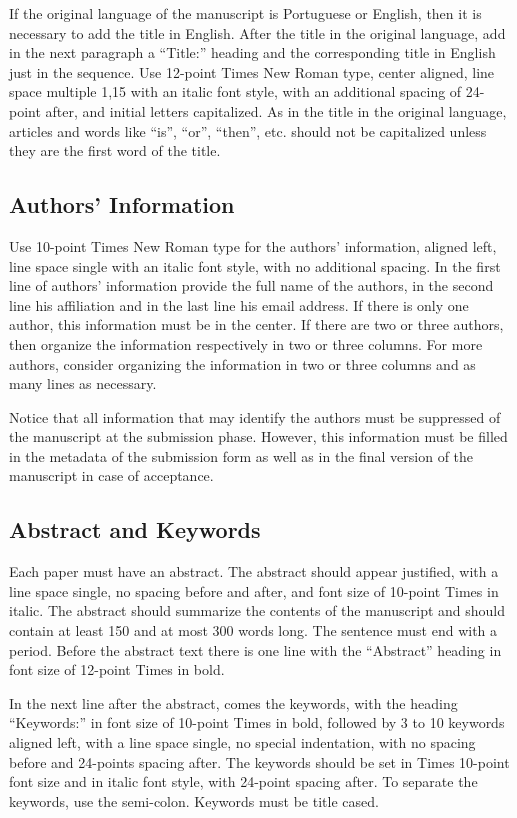 \documentclass[english, spanish, brazilian]{RBIEarticle} %
\begin{document}
If the original language of the manuscript is Portuguese or English, then it is necessary to add the title in English. After the title in the original language, add in the next paragraph a “Title:” heading and the corresponding title in English just in the sequence. Use 12-point Times New Roman type, center aligned, line space multiple 1,15 with an italic font style, with an additional spacing of 24-point after, and initial letters capitalized. As in the title in the original language, articles and words like ``is'', ``or'', ``then'', etc. should not be capitalized unless they are the first word of the title.


\subsection{Authors’ Information}
Use 10-point Times New Roman type for the authors’ information, aligned left, line space single with an italic font style, with no additional spacing. In the first line of authors’ information provide the full name of the authors, in the second line his affiliation and in the last line his email address. If there is only one author, this information must be in the center. If there are two or three authors, then organize the information respectively in two or three columns. For more authors, consider organizing the information in two or three columns and as many lines as necessary.

Notice that all information that may identify the authors must be suppressed of the manuscript at the submission phase. However, this information must be filled in the metadata of the submission form as well as in the final version of the manuscript in case of acceptance.


\subsection{Abstract and Keywords}
Each paper must have an abstract. The abstract should appear justified, with a line space single, no spacing before and after, and font size of 10-point Times in italic. The abstract should summarize the contents of the manuscript and should contain at least 150 and at most 300 words long. The sentence must end with a period. Before the abstract text there is one line with the ``Abstract'' heading in font size of 12-point Times in bold.

In the next line after the abstract, comes the keywords, with the heading ``Keywords:'' in font size of 10-point Times in bold, followed by 3 to 10 keywords aligned left, with a line space single, no special indentation, with no spacing before and 24-points spacing after. The keywords should be set in Times 10-point font size and in italic font style, with 24-point spacing after. To separate the keywords, use the semi-colon. Keywords must be title cased.
\end{document}
